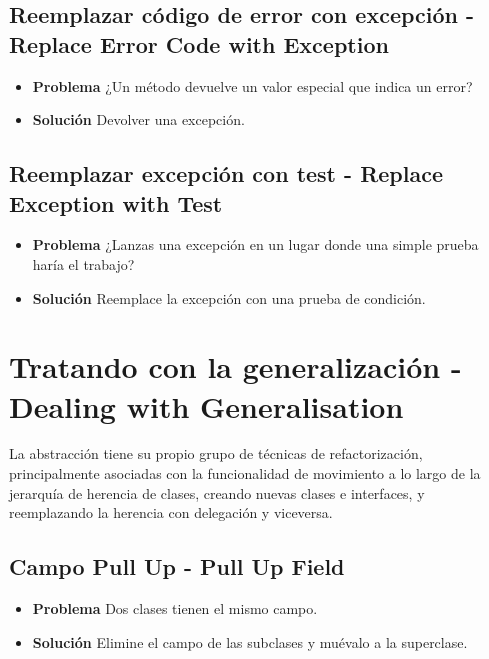 \documentclass[11pt,a4paper,oneside]{book}
\begin{document}


\subsection{Reemplazar código de error con excepción - Replace Error Code with Exception}
\label{replaceerrorcodewithexception}
\begin{itemize}
    \item \textbf{Problema} ¿Un método devuelve un valor especial que indica un error?
    \item \textbf{Solución} Devolver una excepción.
\end{itemize}
    


\subsection{Reemplazar excepción con test - Replace Exception with Test}
\label{replaceexceptionwithtest}
\begin{itemize}
    \item \textbf{Problema} ¿Lanzas una excepción en un lugar donde una simple prueba haría el trabajo?
    \item \textbf{Solución} Reemplace la excepción con una prueba de condición.
\end{itemize}
    



\section{Tratando con la generalización - Dealing with Generalisation}

La abstracción tiene su propio grupo de técnicas de refactorización, principalmente asociadas con la funcionalidad de movimiento a lo largo de la jerarquía de herencia de clases, creando nuevas clases e interfaces, y reemplazando la herencia con delegación y viceversa.

\subsection{Campo Pull Up - Pull Up Field}
\label{pullupfield}
\begin{itemize}
    \item \textbf{Problema} Dos clases tienen el mismo campo.
    \item \textbf{Solución} Elimine el campo de las subclases y muévalo a la superclase.
\end{itemize}
\end{document}
